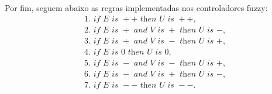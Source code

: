 Por fim, seguem abaixo as regras implementadas nos controladores fuzzy:
\vspace{-0.3cm}
\begin{equation*}
\begin{aligned}
    &\text{1. } \textit{if } E \textit{ is } ++ \textit{ then } U \textit{ is } ++, \\
    &\text{2. } \textit{if } E \textit{ is } + \textit{ and } V \textit{ is } + \textit{ then } U \textit{ is } -, \\
    &\text{3. } \textit{if } E \textit{ is } + \textit{ and } V \textit{ is } - \textit{ then } U \textit{ is } +, \\
    &\text{4. } \textit{if } E \textit{ is } 0 \textit{ then } U \textit{ is } 0, \\
    &\text{5. } \textit{if } E \textit{ is } - \textit{ and } V \textit{ is } - \textit{ then } U \textit{ is } +, \\
    &\text{6. } \textit{if } E \textit{ is } - \textit{ and } V \textit{ is } + \textit{ then } U \textit{ is } -, \\
    &\text{7. } \textit{if } E \textit{ is } -- \textit{ then } U \textit{ is } --.
\end{aligned}
\end{equation*}

